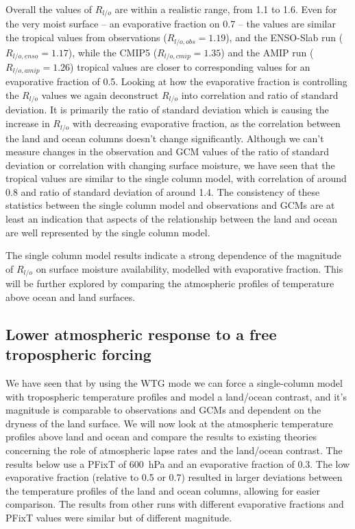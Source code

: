 Overall the values of $R_{l/o}$ are within a realistic range, from 1.1 to 1.6.
Even for the very moist surface -- an evaporative fraction on 0.7 -- the values 
are similar the tropical values from observations ($R_{l/o, obs} =1.19$), and 
the ENSO-Slab run ($R_{l/o, enso} =1.17$), while the CMIP5 ($R_{l/o,cmip} 
=1.35$) and the AMIP run ($R_{l/o, amip} =1.26$) tropical values are closer to 
corresponding values for an evaporative fraction of 0.5. Looking at how the 
evaporative fraction is controlling the $R_{l/o}$ values we again deconstruct 
$R_{l/o}$ into correlation and ratio of standard deviation. It is primarily the 
ratio of standard deviation which is causing the increase in $R_{l/o}$ with 
decreasing evaporative fraction, as the correlation between the land and ocean 
columns doesn't change significantly.  Although we can't measure changes in the 
observation and GCM values of the ratio of standard deviation or correlation 
with changing surface moisture, we have seen that the tropical values are 
similar to the single column model, with correlation of around 0.8 and ratio of 
standard deviation of around 1.4.  The consistency of these statistics between 
the single column model and observations and GCMs are at least an indication 
that aspects of the relationship between the land and ocean are well represented 
by the single column model. 

The single column model results indicate a strong dependence of the magnitude of 
$R_{l/o}$ on surface moisture availability, modelled with evaporative fraction.  
This will be further explored by comparing the atmospheric profiles of 
temperature above ocean and land surfaces.


\subsection{Lower atmospheric response to a free tropospheric forcing}

We have seen that by using the WTG mode we can force a single-column model with 
tropospheric temperature profiles and model a land/ocean contrast, and it's 
magnitude is comparable to observations and GCMs and dependent on the dryness of 
the land surface.  We will now look at the atmospheric temperature profiles 
above land and ocean and compare the results to existing theories concerning the 
role of atmospheric lapse rates and the land/ocean contrast. The results below 
use a PFixT of \SI{600}{\hecto\pascal} and an evaporative fraction of 0.3. The 
low evaporative fraction (relative to 
0.5 or 0.7) resulted in larger deviations between the temperature profiles of 
the land and ocean columns, allowing for easier comparison. The results from 
other runs with different evaporative fractions and PFixT values were similar 
but of different magnitude.\\

